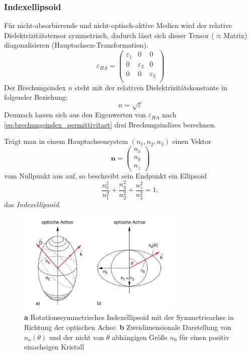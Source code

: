 \documentclass[a4paper, 11pt, ngerman, parskip=half-]{scrartcl}
\begin{document}
\subsubsection*{Indexellipsoid}
Für nicht-absorbierende und nicht-optisch-aktive Medien wird der relative Dielektrizitätstensor symmetrisch, dadurch lässt sich dieser Tensor ($\approx$Matrix) diagonalisieren (Hauptachsen-Transformation).
\[\varepsilon_{HA} = \begin{pmatrix}
        \varepsilon_1 & 0             & 0             \\
        0             & \varepsilon_2 & 0             \\
        0             & 0             & \varepsilon_3 \\
    \end{pmatrix}\]
Der Brechungsindex $n$ steht mit der relativen Dielektrizitätskonstante in folgender Beziehung:
\begin{equation}
    \label{eq:brechungsindex_permittivitaet}
    n = \sqrt{\varepsilon}
\end{equation}
Demnach lassen sich aus den Eigenwerten von $\varepsilon_{HA}$ nach \autoref{eq:brechungsindex_permittivitaet} drei Brechungsindizes berechnen.

Trägt man in einem Hauptachsensystem $(n_1, n_2, n_3)$ einen Vektor
\[\textbf{n} = \begin{pmatrix}
        n_x \\
        n_y \\
        n_z
    \end{pmatrix}\]
vom Nullpunkt aus auf, so beschreibt sein Endpunkt ein Ellipsoid
\[\frac{n_x^2}{n_1^2} + \frac{n_y^2}{n_2^2} + \frac{n_z^2}{n_3^2} = 1,\]
das \textit{Indexellipsoid}.
%
\begin{figure}[H]
    \centering
    \begin{samepage}
        \includegraphics[width=0.7\textwidth]{image/15/einachsiger_kristall.jpg}
        \caption{\textbf{a} Rotationssymmetrisches Indexellipsoid mit der Symmetrieachse in Richtung der optischen Achse. \textbf{b} Zweidimensionale Darstellung von $n_a(\theta)$ und der nicht von $\theta$ abhängigen Größe $n_0$ für einen positiv einachsigen Kristall}
        \label{fig:indexellipsoid_einachsig}
    \end{samepage}
\end{figure}
%
\end{document}
